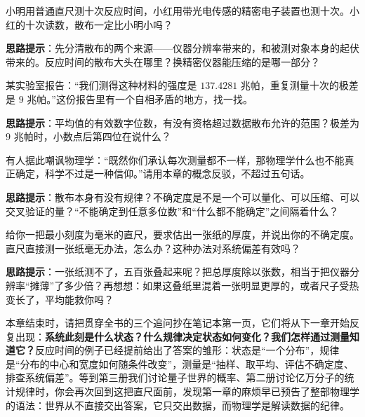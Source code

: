 \begin{puzzles}
\item 小明用普通直尺测十次反应时间，小红用带光电传感的精密电子装置也测十次。小红的十次读数，散布一定比小明小吗？

\textbf{思路提示}：先分清散布的两个来源——仪器分辨率带来的，和被测对象本身的起伏带来的。反应时间的散布大头在哪里？换精密仪器能压缩的是哪一部分？
\item 某实验室报告：“我们测得这种材料的强度是 \(137.4281\) 兆帕，重复测量十次的极差是 \(9\) 兆帕。”这份报告里有一个自相矛盾的地方，找一找。

\textbf{思路提示}：平均值的有效数字位数，有没有资格超过数据散布允许的范围？极差为 \(9\) 兆帕时，小数点后第四位在说什么？
\item 有人据此嘲讽物理学：“既然你们承认每次测量都不一样，那物理学什么也不能真正确定，科学不过是一种信仰。”请用本章的概念反驳，不超过五句话。

\textbf{思路提示}：散布本身有没有规律？不确定度是不是一个可以量化、可以压缩、可以交叉验证的量？“不能确定到任意多位数”和“什么都不能确定”之间隔着什么？
\item 给你一把最小刻度为毫米的直尺，要求估出一张纸的厚度，并说出你的不确定度。直尺直接测一张纸毫无办法，怎么办？这种办法对系统偏差有效吗？

\textbf{思路提示}：一张纸测不了，五百张叠起来呢？把总厚度除以张数，相当于把仪器分辨率“摊薄”了多少倍？再想想：如果这叠纸里混着一张明显更厚的，或者尺子受热变长了，平均能救你吗？
\end{puzzles}

本章结束时，请把贯穿全书的三个追问抄在笔记本第一页，它们将从下一章开始反复出现：\textbf{系统此刻是什么状态？什么规律决定状态如何变化？我们怎样通过测量知道它？}反应时间的例子已经提前给出了答案的雏形：状态是“一个分布”，规律是“分布的中心和宽度如何随条件改变”，测量是“抽样、取平均、评估不确定度、排查系统偏差”。等到第三册我们讨论量子世界的概率、第二册讨论亿万分子的统计规律时，你会再次回到这把直尺面前，发现第一章的麻烦早已预告了整部物理学的语法：世界从不直接交出答案，它只交出数据，而物理学是解读数据的纪律。
